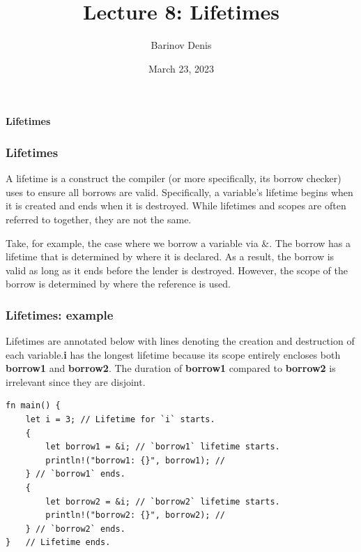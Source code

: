 \documentclass[aspectratio=1610,t]{beamer}
\title{Lecture 8: Lifetimes}
\date{March 23, 2023}
\author{Barinov Denis}
\institute{barinov.diu@gmail.com}
\begin{document}

\begin{frame}
\maketitle
\end{frame}


\begin{frame}[c]
\centering\Huge\textbf{Lifetimes}
\end{frame}


\begin{frame}[fragile]
\frametitle{Lifetimes}
    A lifetime is a construct the compiler (or more specifically, its borrow checker) uses to ensure all borrows are valid. Specifically, a variable's lifetime begins when it is created and ends when it is destroyed. While lifetimes and scopes are often referred to together, they are not the same.

    Take, for example, the case where we borrow a variable via \&. The borrow has a lifetime that is determined by where it is declared. As a result, the borrow is valid as long as it ends before the lender is destroyed. However, the scope of the borrow is determined by where the reference is used.
\end{frame}


\begin{frame}[fragile]
\frametitle{Lifetimes: example}
Lifetimes are annotated below with lines denoting the creation and destruction of each variable.\textbf{i} has the longest lifetime because its scope entirely encloses both \textbf{borrow1} and \textbf{borrow2}. The duration of \textbf{borrow1} compared to \textbf{borrow2} is irrelevant since they are disjoint.
\begin{verbatim}
fn main() {
    let i = 3; // Lifetime for `i` starts.                                                  
    {                                                  
        let borrow1 = &i; // `borrow1` lifetime starts.                                        
        println!("borrow1: {}", borrow1); //              
    } // `borrow1` ends.                                                   
    {                                               
        let borrow2 = &i; // `borrow2` lifetime starts.                                               
        println!("borrow2: {}", borrow2); //              
    } // `borrow2` ends.                                                 
}   // Lifetime ends.
\end{verbatim}
\end{frame}
\end{document}
